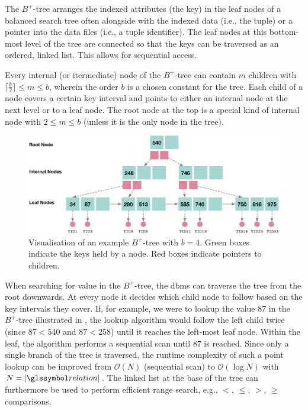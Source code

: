 The $B^{+}$-tree arranges the indexed attributes (the key) in the leaf nodes of a balanced search tree often alongside with the indexed data (i.e., the tuple) or a pointer into the data files (i.e., a tuple identifier). The leaf nodes at this bottom-most level of the tree are connected so that the keys can be traversed as an ordered, linked list. This allows for sequential access.

Every internal (or itermediate) node of the $B^{+}$-tree can contain $m$ children with $\lceil \frac{b}{2} \rceil \leq m \leq b$, wherein the order $b$ is a chosen constant for the tree. Each child of a node covers a certain key interval and points to either an internal node at the next level or to a leaf node. The root node at the top is a special kind of internal node with $2 \leq m \leq b$ (unless it is the only node in the tree). 

\begin{figure}[b]
    \centering
    \includegraphics[width=\textwidth]{figures/bptree.eps}
    \caption{Visualisation of an example $B^{+}$-tree with $b = 4$. Green boxes indicate the keys held by a node. Red boxes indicate pointers to children.}
    \label{figure:bptree}
\end{figure}

When searching for value in the $B^{+}$-tree, the \acrshort{dbms} can traverse the tree from the root downwards. At every node it decides which child node to follow based on the key intervals they cover. If, for example, we were to lookup the value $87$ in the $B^{+}$-tree illustrated in , the lookup algorithm would follow the left child twice (since $87 < 540$ and $87 < 258$) until it reaches the left-most leaf node. Within the leaf, the algorithm performs a sequential scan until $87$ is reached. Since only a single branch of the tree is traversed, the runtime complexity of such a point lookup can be improved from $\mathcal{O}(N)$ (sequential scan) to $\mathcal{O}(\log N)$ with $N = |\relation|$. The linked list at the base of the tree can furthermore be used to perform efficient range search, e.g., $<$, $\leq$, $>$, $\geq$ comparisons.


